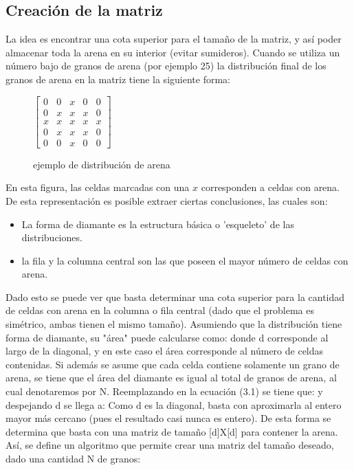 \documentclass[letterpaper,11pt]{article} %
\begin{document}
\subsection{Creación de la matriz}
La idea es encontrar una cota superior para el tamaño de la matriz, y así poder almacenar toda la arena en su interior (evitar sumideros). Cuando se utiliza un número bajo de granos de arena (por ejemplo 25) la distribución final de los granos de arena en la matriz tiene la siguiente forma:
\begin{figure}[h!]
\centering
$
\begin{bmatrix}
0&0&x&0&0 \\
0&x&x&x&0 \\
x&x&x&x&x \\
0&x&x&x&0 \\
0&0&x&0&0
\end{bmatrix}
$
\caption{ejemplo de distribución de arena}
\end{figure}
En esta figura, las celdas marcadas con una $x$ corresponden a celdas con arena. De esta representación es posible extraer ciertas conclusiones, las cuales son:
\begin{itemize}
    \item La forma de diamante es la estructura básica o 'esqueleto' de las distribuciones.
     \item la fila y la columna central son las que poseen el mayor número de celdas con arena.
\end{itemize}
Dado esto se puede ver que basta determinar una cota superior para la cantidad de celdas con arena en la columna o fila central (dado que el problema es simétrico, ambas tienen el mismo tamaño). Asumiendo que la distribución tiene forma de diamante, su "área" puede calcularse como:
donde d corresponde al largo de la diagonal, y en este caso el área corresponde al número de celdas contenidas. Si además se asume que cada celda contiene solamente un grano de arena, se tiene que el área del diamante es igual al total de granos de arena, al cual denotaremos por N. Reemplazando en la ecuación (3.1) se tiene que:
y despejando d se llega a:
Como d es la diagonal, basta con aproximarla al entero mayor más cercano (pues el resultado casi nunca es entero). De esta forma se determina que basta con una matriz de tamaño [d]X[d] para contener la arena. Así, se define un algoritmo que permite crear una matriz del tamaño deseado, dado una cantidad N de granos:
\lstset{style=Java}
\end{document}
